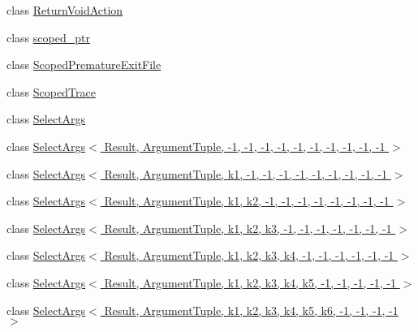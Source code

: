 \begin{DoxyCompactItemize}
class \hyperlink{classtesting_1_1internal_1_1_return_void_action}{Return\+Void\+Action}
\item 
class \hyperlink{classtesting_1_1internal_1_1scoped__ptr}{scoped\+\_\+ptr}
\item 
class \hyperlink{classtesting_1_1internal_1_1_scoped_premature_exit_file}{Scoped\+Premature\+Exit\+File}
\item 
class \hyperlink{classtesting_1_1internal_1_1_scoped_trace}{Scoped\+Trace}
\item 
class \hyperlink{classtesting_1_1internal_1_1_select_args}{Select\+Args}
\item 
class \hyperlink{classtesting_1_1internal_1_1_select_args_3_01_result_00_01_argument_tuple_00_01-1_00_01-1_00_01-99299a766a33bd3110e39f51f43b194a}{Select\+Args$<$ Result, Argument\+Tuple, -\/1, -\/1, -\/1, -\/1, -\/1, -\/1, -\/1, -\/1, -\/1, -\/1 $>$}
\item 
class \hyperlink{classtesting_1_1internal_1_1_select_args_3_01_result_00_01_argument_tuple_00_01k1_00_01-1_00_01-33116bd77067572e384b90e7c70b03c4}{Select\+Args$<$ Result, Argument\+Tuple, k1, -\/1, -\/1, -\/1, -\/1, -\/1, -\/1, -\/1, -\/1, -\/1 $>$}
\item 
class \hyperlink{classtesting_1_1internal_1_1_select_args_3_01_result_00_01_argument_tuple_00_01k1_00_01k2_00_01-03e4fb75e6504ae34fdb48d64bb6de95}{Select\+Args$<$ Result, Argument\+Tuple, k1, k2, -\/1, -\/1, -\/1, -\/1, -\/1, -\/1, -\/1, -\/1 $>$}
\item 
class \hyperlink{classtesting_1_1internal_1_1_select_args_3_01_result_00_01_argument_tuple_00_01k1_00_01k2_00_01k43121451b69bc30ee1dad887e67d8807}{Select\+Args$<$ Result, Argument\+Tuple, k1, k2, k3, -\/1, -\/1, -\/1, -\/1, -\/1, -\/1, -\/1 $>$}
\item 
class \hyperlink{classtesting_1_1internal_1_1_select_args_3_01_result_00_01_argument_tuple_00_01k1_00_01k2_00_01k7cadbb88f40ff7408f8c070bb61c70db}{Select\+Args$<$ Result, Argument\+Tuple, k1, k2, k3, k4, -\/1, -\/1, -\/1, -\/1, -\/1, -\/1 $>$}
\item 
class \hyperlink{classtesting_1_1internal_1_1_select_args_3_01_result_00_01_argument_tuple_00_01k1_00_01k2_00_01k6061407a5fa2cad2c495e8e16ee67874}{Select\+Args$<$ Result, Argument\+Tuple, k1, k2, k3, k4, k5, -\/1, -\/1, -\/1, -\/1, -\/1 $>$}
\item 
class \hyperlink{classtesting_1_1internal_1_1_select_args_3_01_result_00_01_argument_tuple_00_01k1_00_01k2_00_01k203aa538560773abfacd746d313c06ae}{Select\+Args$<$ Result, Argument\+Tuple, k1, k2, k3, k4, k5, k6, -\/1, -\/1, -\/1, -\/1 $>$}

\end{DoxyCompactItemize}
